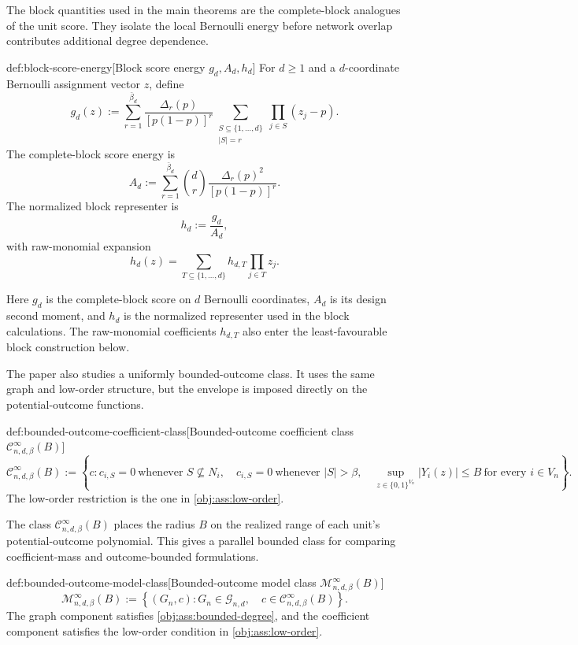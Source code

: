 The block quantities used in the main theorems are the complete-block analogues of the unit score. They isolate the local Bernoulli energy before network overlap contributes additional degree dependence.

\begin{definitionv}{def:block-score-energy}[Block score energy \(g_d,A_d,h_d\)]
For \(d\ge 1\) and a \(d\)-coordinate Bernoulli assignment vector \(z\), define
\[
g_d(z)
:=
\sum_{r=1}^{\bar\beta_d}
\frac{\Delta_r(p)}{[p(1-p)]^r}
\sum_{\substack{S\subseteq\{1,\ldots,d\}\\ |S|=r}}
\prod_{j\in S}(z_j-p).
\]
The complete-block score energy is
\[
A_d
:=
\sum_{r=1}^{\bar\beta_d}
\binom{d}{r}
\frac{\Delta_r(p)^2}{[p(1-p)]^r}.
\]
The normalized block representer is
\[
h_d:=\frac{g_d}{A_d},
\]
with raw-monomial expansion
\[
h_d(z)=
\sum_{T\subseteq\{1,\ldots,d\}}
h_{d,T}\prod_{j\in T}z_j .
\]
\end{definitionv}

Here \(g_d\) is the complete-block score on \(d\) Bernoulli coordinates, \(A_d\) is its design second moment, and \(h_d\) is the normalized representer used in the block calculations. The raw-monomial coefficients \(h_{d,T}\) also enter the least-favourable block construction below.

The paper also studies a uniformly bounded-outcome class. It uses the same graph and low-order structure, but the envelope is imposed directly on the potential-outcome functions.

\begin{definitionv}{def:bounded-outcome-coefficient-class}[Bounded-outcome coefficient class $\mathcal C_{n,d,\beta}^{\infty}(B)$]
\[
\mathcal C_{n,d,\beta}^{\infty}(B)
:=
\left\{
c:
 c_{i,S}=0\ \text{whenever } S\not\subseteq N_i,\quad
 c_{i,S}=0\ \text{whenever } |S|>\beta,\quad
\sup_{z\in\{0,1\}^{V_n}} |Y_i(z)|\le B\ \text{for every } i\in V_n
\right\}.
\]
The low-order restriction is the one in \cref{obj:ass:low-order}.
\end{definitionv}

The class \(\mathcal C_{n,d,\beta}^{\infty}(B)\) places the radius \(B\) on the realized range of each unit's potential-outcome polynomial. This gives a parallel bounded class for comparing coefficient-mass and outcome-bounded formulations.

\begin{definitionv}{def:bounded-outcome-model-class}[Bounded-outcome model class $\mathcal M_{n,d,\beta}^{\infty}(B)$]
\[
\mathcal M_{n,d,\beta}^{\infty}(B)
:=
\left\{
(G_n,c):
G_n\in\mathcal G_{n,d},\quad
c\in\mathcal C_{n,d,\beta}^{\infty}(B)
\right\}.
\]
The graph component satisfies \cref{obj:ass:bounded-degree}, and the coefficient component satisfies the low-order condition in \cref{obj:ass:low-order}.
\end{definitionv}

